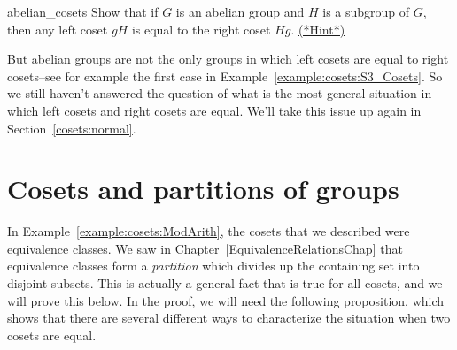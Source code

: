   

\begin{exercise}{abelian_cosets}
Show that if $G$ is an abelian group and $H$ is a subgroup of $G$, then any left coset $gH$ is equal to the right coset $Hg$.  
\hyperref[sec:cosets:hints]{(*Hint*)}
\end{exercise}

But abelian groups are not the only groups in which left cosets are equal to right cosets--see for example the first case in Example~\ref{example:cosets:S3_Cosets}. So we still haven't answered the question of what is the most general situation in which left cosets and right cosets are equal. We'll take this issue up again in Section~\ref{cosets:normal}.


  




\section{Cosets and partitions of groups}\label{sec:CosetsPartitions}

In Example~\ref{example:cosets:ModArith}, the cosets that we described were equivalence classes. We saw in Chapter~\ref{EquivalenceRelationsChap} that equivalence classes form a \emph{partition} which divides up the containing set into disjoint subsets.
This is actually a general fact that is true for all cosets, and we will prove this below. In the proof, we will need the following proposition, which shows that there are several different ways to characterize the situation when  two cosets are equal.  

